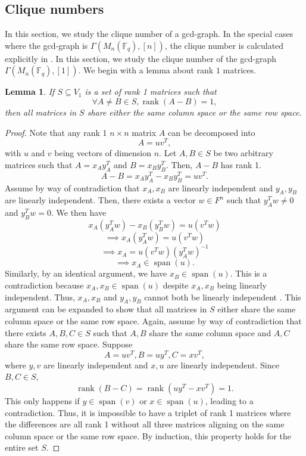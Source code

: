 \documentclass[12pt, a4paper]{amsart}
\newtheorem{lem}[thm]{Lemma}
\theoremstyle{definition}
\numberwithin{equation}{section}
\newcommand{\F}{\mathbb{F}}
\DeclareMathOperator{\rank}{rank}
\DeclareMathOperator{\spn}{span}
\begin{document}
\subsection{Clique numbers} \label{subsec:rank1}
In this section, we study the clique number of a gcd-graph. In the special cases where the gcd-graph is $\Gamma(M_n(\F_q), [n])$, the clique number is calculated explicitly in \cite{kiani2012unitary}. In this section, we study the clique number of the gcd-graph $\Gamma(M_n(\F_q), [1]).$ We begin with a lemma about rank $1$ matrices.

\begin{lem} \label{lem:space}
    If $S \subseteq V_1$ is a set of rank 1 matrices such that
    \[\forall A \neq B \in S, \rank(A - B) = 1,\]
    then all matrices in $S$ share either the same column space or the same row space.
\end{lem}
\begin{proof}
    Note that any rank 1 $n \times n$ matrix $A$ can be decomposed into
    \[A = uv^T,\]
    with $u$ and $v$ being vectors of dimension $n$. Let $A,B \in S$ be two arbitrary matrices such that $A= x_A y_A^T$ and $B = x_B y_B^T$. Then, $A - B$ has rank 1.
    \[A - B = x_A y_A^T - x_B y_B^T = uv^T.\]
    Assume by way of contradiction that $x_{A},x_{B}$ are linearly independent and $y_{A},y_{B}$ are linearly independent. Then, there exists a vector $w\in F^n$ such that $y_{A}^T w \neq 0$ and $y_{B}^T w = 0$. We then have 
    \[x_{A} \left( y_{A}^T w \right) - x_{B} \left( y_{B}^T w \right) = u \left( v^T w \right)\]
    \[ \implies x_{A} \left( y_{A}^T w \right) = u \left( v^T w \right)\]
    \[ \implies x_{A} = u \left( v^T w \right)\left( y_{A}^T w \right)^{-1}\]
    \[ \implies x_{A} \in \spn(u).\]
    Similarly, by an identical argument, we have     $x_{B} \in \spn(u).$  This is a contradiction because $x_{A},x_{B} \in \spn(u)$ despite $x_{A},x_{B}$ being linearly independent. Thus, $x_{A},x_{B}$ and $y_{A},y_{B}$ cannot both be linearly independent . This argument can be expanded to show that all matrices in $S$ either share the same column space or the same row space. Again, assume by way of contradiction that there exists $A,B,C \in S$ such that $A,B$ share the same column space and $A,C$ share the same row space. Suppose
    \[A=uv^T,B=uy^T,C=xv^T,\]
    where $y,v$ are linearly independent and $x,u$ are linearly independent. Since $B,C \in S$,
    \[\rank(B-C) = \rank(uy^T - xv^T) =1.\]
    This only happens if $y \in \spn(v)$ or $x \in \spn(u)$, leading to a contradiction. Thus, it is impossible to have a triplet of rank 1 matrices where the differences are all rank 1 without all three matrices aligning on the same column space or the same row space. By induction, this property holds for the entire set $S$.

    
    
\end{proof}
\end{document}
